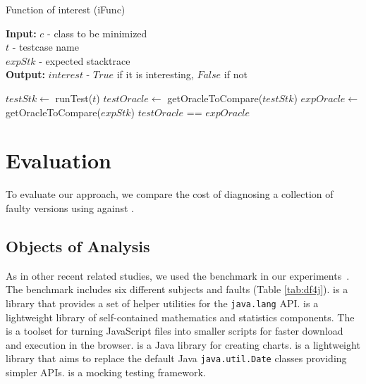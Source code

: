 \documentclass{article}
\begin{document}
\begin{algorithm}[h]
	\caption{Function of interest (iFunc)}
	\label{alg:finc}
	\begin{flushleft}
		\textbf{Input:} $c$ - class to be minimized\\
		\hspace{2.75em} $t$ - testcase name\\
		\hspace{2.75em} $expStk$ -  expected stacktrace\\
		\textbf{Output:} $interest$ - $True$ if it is interesting, $False$ if not \\
	\end{flushleft}
	\begin{algorithmic}[1]
		\State $testStk \leftarrow$ runTest($t$)
		\State $testOracle \leftarrow$ getOracleToCompare($testStk$)
		\State $expOracle \leftarrow$ getOracleToCompare($expStk$)
		\State \Return $testOracle$ == $expOracle$
		\EndFunction

	\end{algorithmic}

\end{algorithm}

\section{Evaluation}
\label{sec:eval}

To evaluate our approach, we compare the cost of diagnosing
a collection of faulty versions using \sfl{}
against \comb{}.

\subsection{Objects of Analysis}\label{sec:analysis}

As in other recent related studies, we used the \dfj{} benchmark in
our experiments~\cite{just-defects4j-issta2014}. The \dfj{} benchmark
includes six different subjects and \numFaults{} faults (Table \ref{tab:df4j}).
\lang{} is a library that provides a set of helper utilities for the
     {\small\texttt{java.lang}} API. \cmath{} is a lightweight library
     of self-contained mathematics and statistics components. The
     \closure{} is a toolset for turning JavaScript files into smaller
     scripts for faster download and execution in the
     browser. \chart{} is a Java library for creating charts. \jtime{}
     is a lightweight library that aims to replace the default Java
     {\small\texttt{java.util.Date}} classes providing simpler
     APIs. \mockito{} is a mocking testing framework.
\end{document}

